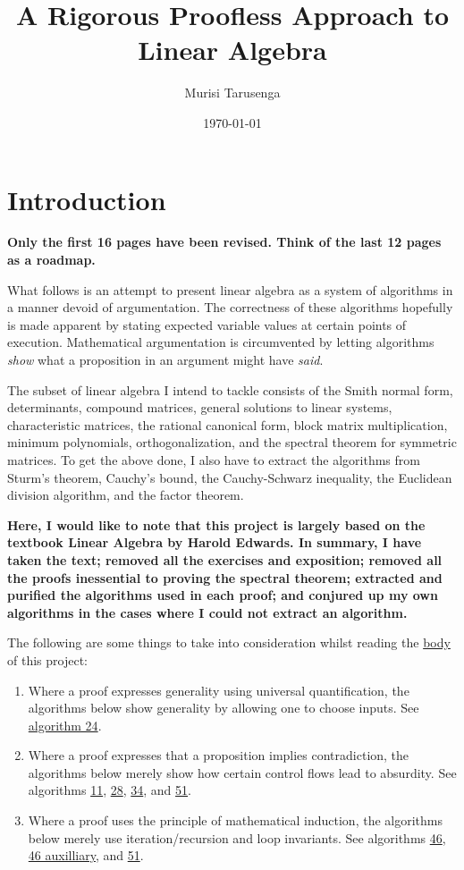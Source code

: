 \documentclass[twocolumn]{article}
\begin{document}
	\title{A Rigorous Proofless Approach to Linear Algebra}
	\author{Murisi Tarusenga}
	\date{\today{} \currenttime}
	\maketitle
	\section{Introduction}
		\textbf{Only the first 16 pages have been revised. Think of the last 12 pages as a roadmap.}
		
		What follows is an attempt to present linear algebra as a system of algorithms in a manner devoid of argumentation. The correctness of these algorithms hopefully is made apparent by stating expected variable values at certain points of execution. Mathematical argumentation is circumvented by letting algorithms \textit{show} what a proposition in an argument might have \textit{said}.
		
		The subset of linear algebra I intend to tackle consists of the Smith normal form, determinants, compound matrices, general solutions to linear systems, characteristic matrices, the rational canonical form, block matrix multiplication, minimum polynomials, orthogonalization, and the spectral theorem for symmetric matrices. To get the above done, I also have to extract the algorithms from Sturm's theorem, Cauchy's bound, the Cauchy-Schwarz inequality, the Euclidean division algorithm, and the factor theorem.
		
		\textbf{Here, I would like to note that this project is largely based on the textbook Linear Algebra by Harold Edwards. In summary, I have taken the text; removed all the exercises and exposition; removed all the proofs inessential to proving the spectral theorem; extracted and purified the algorithms used in each proof; and conjured up my own algorithms in the cases where I could not extract an algorithm.}
		
		The following are some things to take into consideration whilst reading the \hyperref[sec:body]{body} of this project:
		\begin{enumerate}
			\item Where a proof expresses generality using universal quantification, the algorithms below show generality by allowing one to choose inputs. See \hyperref[sec:algorithm 24]{algorithm 24}.
			\item Where a proof expresses that a proposition implies contradiction, the algorithms below merely show how certain control flows lead to absurdity. See algorithms \hyperref[sec:algorithm 11]{11}, \hyperref[sec:algorithm 28]{28}, \hyperref[sec:algorithm 35]{34}, and \hyperref[sec:algorithm 52]{51}.
			\item Where a proof uses the principle of mathematical induction, the algorithms below merely use iteration/recursion and loop invariants. See algorithms \hyperref[sec:algorithm 47]{46}, \hyperref[sec:algorithm 47]{46 auxilliary}, and \hyperref[sec:algorithm 52]{51}.
		\end{enumerate}
		
\end{document}
